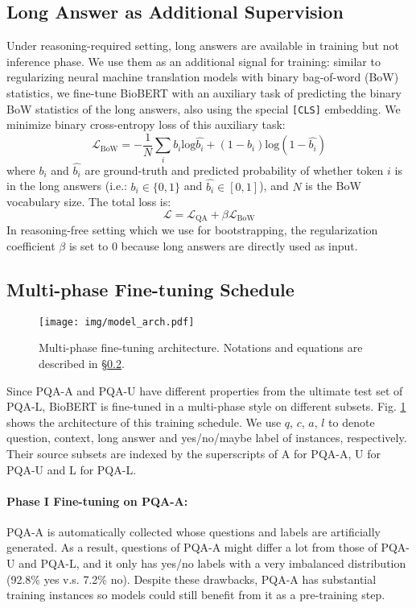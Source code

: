 \documentclass[11pt,a4paper]{article}
\begin{document}
\subsection{Long Answer as Additional Supervision}
Under reasoning-required setting, long answers are available in training but not inference phase. We use them as an additional signal for training: similar to \citet{ma2018bag} regularizing neural machine translation models with binary bag-of-word (BoW) statistics, we fine-tune BioBERT with an auxiliary task of predicting the binary BoW statistics of the long answers, also using the special {\tt [CLS]} embedding. We minimize binary cross-entropy loss of this auxiliary task:
\[
\mathcal{L}_\text{BoW} = - \frac{1}{N} \sum_i b_i \text{log}\hat{b_i} + (1-b_i) \text{log}(1-\hat{b_i})
\]
where $b_i$ and $\hat{b_i}$ are ground-truth and predicted probability of whether token $i$ is in the long answers (i.e.: $b_i \in \{0, 1\}$ and $\hat{b_i} \in [0, 1]$), and $N$ is the BoW vocabulary size. The total loss is:
\[
\mathcal{L} = \mathcal{L}_\text{QA} + \beta \mathcal{L}_\text{BoW}
\]
In reasoning-free setting which we use for bootstrapping, the regularization coefficient $\beta$ is set to 0 because long answers are directly used as input.

\subsection{Multi-phase Fine-tuning Schedule} \label{notation}
\begin{figure}
    \centering
    \texttt{[image: img/model\_arch.pdf]}
    \vskip -0.15cm
    \caption{Multi-phase fine-tuning architecture. Notations and equations are described in \S \ref{notation}.}
    \label{fig:arch}
    \vspace{-0.5em}
\end{figure}

Since PQA-A and PQA-U have different properties from the ultimate test set of PQA-L, BioBERT is fine-tuned in a multi-phase style on different subsets. Fig. \ref{fig:arch} shows the architecture of this training schedule. We use $q$, $c$, $a$, $l$ to denote question, context, long answer and yes/no/maybe label of instances, respectively. Their source subsets are indexed by the superscripts of A for PQA-A, U for PQA-U and L for PQA-L.

\paragraph{Phase I Fine-tuning on PQA-A:}
PQA-A is automatically collected whose questions and labels are artificially generated. As a result, questions of PQA-A might differ a lot from those of PQA-U and PQA-L, and it only has yes/no labels with a very imbalanced distribution (92.8\% yes v.s. 7.2\% no). Despite these drawbacks, PQA-A has substantial training instances so models could still benefit from it as a pre-training step.
\end{document}
